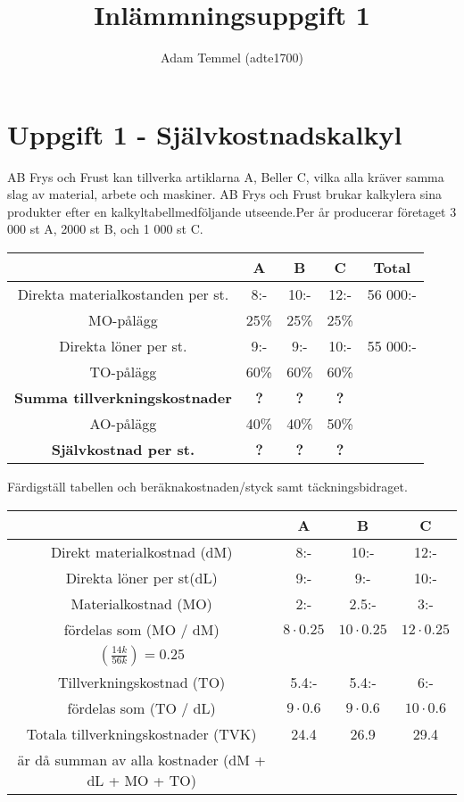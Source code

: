 \documentclass[a4paper, titlepage,12pt]{article}
\title{Inlämmningsuppgift 1}
\author{Adam Temmel (adte1700)}
\begin{document}
	\maketitle

	\section*{Uppgift 1 - Självkostnadskalkyl}
		AB Frys och Frust kan tillverka artiklarna A, Beller C, vilka alla kräver samma slag av material, arbete och maskiner. AB Frys och Frust brukar kalkylera sina produkter efter en kalkyltabellmedföljande utseende.Per år producerar företaget 3 000 st A, 2000 st B, och 1 000 st C.
		\begin{center}
			\begin{tabular}{ |c|c|c|c|c| }
				\hline
				& \textbf{A} & \textbf{B} & \textbf{C} & \textbf{Total} \\
				\hline
				Direkta materialkostanden per st. & 8:- & 10:- & 12:- & 56 000:- \\
				\hline
				MO-pålägg & 25\% & 25\% & 25\% & \\
				\hline
				Direkta löner per st. & 9:- & 9:- & 10:- & 55 000:-\\
				\hline
				TO-pålägg & 60\% & 60\% & 60\% & \\
				\hline
				\textbf{Summa tillverkningskostnader} & \textbf{?} & \textbf{?} & \textbf{?} & \\
				\hline
				AO-pålägg & 40\% & 40\% & 50\% & \\
				\hline
				\textbf{Självkostnad per st.} & \textbf{?} & \textbf{?} & \textbf{?} & \\
				\hline
			\end{tabular}
		\end{center}
		Färdigställ tabellen och beräknakostnaden/styck samt täckningsbidraget.

		\begin{center}
			\begin{tabular}{|c|c|c|c|}
				\hline
				& A & B & C \\
				\hline
				Direkt materialkostnad (dM) & 8:- & 10:- & 12:- \\
				\hline
				Direkta löner per st(dL) & 9:- & 9:- & 10:- \\
				\hline
				Materialkostnad (MO) & 2:- & 2.5:- & 3:- \\
				fördelas som (MO / dM) & $8 \cdot 0.25$ & $10 \cdot 0.25$ & $12 \cdot 0.25$ \\
				$(\frac{14k}{ 56k}) = 0.25$ & & & \\
				\hline
				Tillverkningskostnad (TO) & 5.4:- & 5.4:- & 6:- \\
				fördelas som (TO / dL) & $9 \cdot 0.6$ & $9 \cdot 0.6$ & $10 \cdot 0.6$ \\
				\hline
				Totala tillverkningskostnader (TVK) & 24.4 & 26.9 & 29.4 \\
				är då summan av alla kostnader (dM + dL + MO + TO) & & & \\
				\hline
			\end{tabular}
		\end{center}
\end{document}
